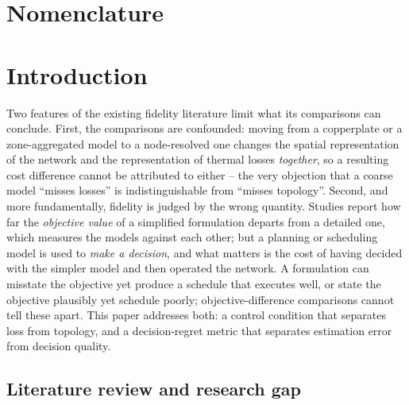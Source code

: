 \documentclass[a4paper,fleqn]{cas-dc}
\begin{document}
\maketitle

\section*{Nomenclature}


\section{Introduction}
\label{sec:introduction}


Two features of the existing fidelity literature limit what its comparisons can
conclude. First, the comparisons are confounded: moving from a copperplate or a
zone-aggregated model to a node-resolved one changes the spatial representation of the
network and the representation of thermal losses \emph{together}, so a resulting cost
difference cannot be attributed to either -- the very objection that a coarse model
``misses losses'' is indistinguishable from ``misses topology''. Second, and more
fundamentally, fidelity is judged by the wrong quantity. Studies report how far the
\emph{objective value} of a simplified formulation departs from a detailed one, which
measures the models against each other; but a planning or scheduling model is used to
\emph{make a decision}, and what matters is the cost of having decided with the simpler
model and then operated the network. A formulation can misstate the objective yet
produce a schedule that executes well, or state the objective plausibly yet schedule
poorly; objective-difference comparisons cannot tell these apart. This paper addresses
both: a control condition that separates loss from topology, and a decision-regret
metric that separates estimation error from decision quality.

\subsection{Literature review and research gap}


\end{document}
